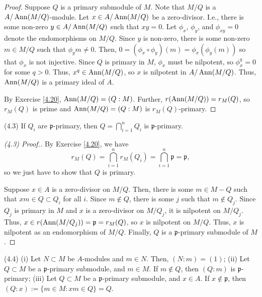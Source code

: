 \begin{proof}
Suppose $Q$ is a primary submodule of $M$. Note that $M/Q$ is a $A/\operatorname{Ann}(M/Q)$-module. Let $x \in A/\operatorname{Ann}(M/Q)$ be a zero-divisor. I.e., there is some non-zero $y \in A/\operatorname{Ann}(M/Q)$
such that $xy = 0$. Let $\phi_x$, $\phi_y$, and $\phi_{xy} = 0$ denote the endomorphisms on $M/Q$. Since $y$ is non-zero, there is some non-zero $m \in M/Q$ such that $\phi_y m \neq 0$.
Then, $0 = (\phi_x \circ \phi_y)(m) = \phi_x(\phi_y(m))$ so that $\phi_x$ is not injective. Since $Q$ is primary in $M$, $\phi_x$ must be nilpotent, so $\phi_x^q = 0$ for some $q>0$. Thus,
$x^q \in \operatorname{Ann}(M/Q)$, so $x$ is nilpotent in $A/\operatorname{Ann}(M/Q)$. Thus, $\operatorname{Ann}(M/Q)$ is a primary ideal of $A$.

By Exercise \ref{4.20}, $\operatorname{Ann}(M/Q) = (Q:M)$. Further, $r(\operatorname{Ann}(M/Q)) = r_M(Q)$, so $r_M(Q)$ is prime and $\operatorname{Ann}(M/Q) = (Q:M)$ is $r_M(Q)$-primary.
\end{proof}

(4.3) If $Q_i$ are $\mathfrak{p}$-primary, then $Q = \bigcap_{i=1}^n Q_i$ is $\mathfrak{p}$-primary.

\begin{proof}[(4.3) Proof.]
By Exercise \ref{4.20}, we have
$$r_M(Q) = \bigcap_{i=1}^n r_M(Q_i) = \bigcap_{i=1}^n \mathfrak{p} = \mathfrak{p},$$
so we just have to show that $Q$ is primary.

Suppose $x \in A$ is a zero-divisor on $M/Q$. Then, there is some $m \in M-Q$ such that $xm \in Q \subset Q_i$ for all $i$. Since $m \not\in Q$, there is some $j$ such that $m \not\in Q_j$.
Since $Q_j$ is primary in $M$ and $x$ is a zero-divisor on $M/Q_j$, it is nilpotent on $M/Q_j$. Thus, $x \in r(\operatorname{Ann}(M/Q_j)) = \mathfrak{p} = r_M(Q)$, so $x$ is nilpotent on $M/Q$. Thus,
$x$ is nilpotent as an endomorphism of $M/Q$. Finally, $Q$ is a $\mathfrak{p}$-primary submodule of $M$.
\end{proof}

(4.4) (i) Let $N \subset M$ be $A$-modules and $m \in N$. Then, $(N : m) = (1)$;
(ii) Let $Q \subset M$ be a $\mathfrak{p}$-primary submodule, and $m \in M$. If $m \not\in Q$, then $(Q:m)$ is $\mathfrak{p}$-primary;
(iii) Let $Q \subset M$ be a $\mathfrak{p}$-primary submodule, and $x \in A$. If $x \not\in \mathfrak{p}$, then $(Q:x) := \{m \in M : xm \in Q\} = Q$.


